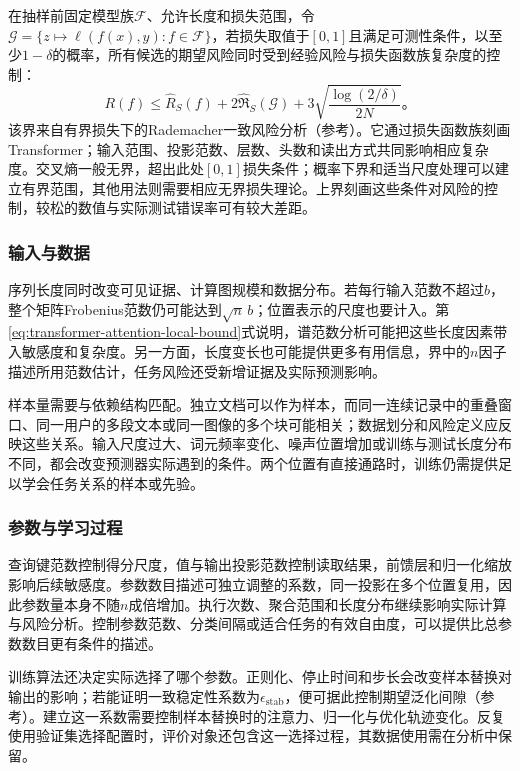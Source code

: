 在抽样前固定模型族$\mathcal F$、允许长度和损失范围，令$\mathcal G=\{z\mapsto\ell(f(x),y):f\in\mathcal F\}$，若损失取值于$[0,1]$且满足可测性条件，以至少$1-\delta$的概率，所有候选的期望风险同时受到经验风险与损失函数族复杂度的控制：
\begin{equation}
  R(f)\leq\widehat R_S(f)+2\widehat{\mathfrak R}_S(\mathcal G)
       +3\sqrt{\frac{\log(2/\delta)}{2N}}\text{。}
  \label{eq:transformer-generalization-bound}
\end{equation}
该界来自有界损失下的Rademacher一致风险分析（参考）。它通过损失函数族刻画Transformer；输入范围、投影范数、层数、头数和读出方式共同影响相应复杂度。交叉熵一般无界，超出此处$[0,1]$损失条件；概率下界和适当尺度处理可以建立有界范围，其他用法则需要相应无界损失理论。上界刻画这些条件对风险的控制，较松的数值与实际测试错误率可有较大差距。

\subsubsection{输入与数据}

序列长度同时改变可见证据、计算图规模和数据分布。若每行输入范数不超过$b$，整个矩阵Frobenius范数仍可能达到$\sqrt n\,b$；位置表示的尺度也要计入。第\ref{eq:transformer-attention-local-bound}式说明，谱范数分析可能把这些长度因素带入敏感度和复杂度。另一方面，长度变长也可能提供更多有用信息，界中的$n$因子描述所用范数估计，任务风险还受新增证据及实际预测影响。

样本量需要与依赖结构匹配。独立文档可以作为样本，而同一连续记录中的重叠窗口、同一用户的多段文本或同一图像的多个块可能相关；数据划分和风险定义应反映这些关系。输入尺度过大、词元频率变化、噪声位置增加或训练与测试长度分布不同，都会改变预测器实际遇到的条件。两个位置有直接通路时，训练仍需提供足以学会任务关系的样本或先验。

\subsubsection{参数与学习过程}

查询键范数控制得分尺度，值与输出投影范数控制读取结果，前馈层和归一化缩放影响后续敏感度。参数数目描述可独立调整的系数，同一投影在多个位置复用，因此参数量本身不随$n$成倍增加。执行次数、聚合范围和长度分布继续影响实际计算与风险分析。控制参数范数、分类间隔或适合任务的有效自由度，可以提供比总参数数目更有条件的描述。

训练算法还决定实际选择了哪个参数。正则化、停止时间和步长会改变样本替换对输出的影响；若能证明一致稳定性系数为$\epsilon_{\mathrm{stab}}$，便可据此控制期望泛化间隙（参考）。建立这一系数需要控制样本替换时的注意力、归一化与优化轨迹变化。反复使用验证集选择配置时，评价对象还包含这一选择过程，其数据使用需在分析中保留。

